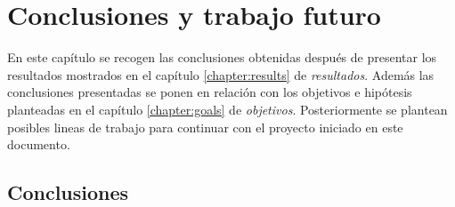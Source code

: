 \chapter{Conclusiones y trabajo futuro}

En este capítulo se recogen las conclusiones obtenidas después de presentar los resultados mostrados en el capítulo \ref{chapter:results} de \textit{resultados}. Además las conclusiones presentadas se ponen en relación con los objetivos e hipótesis planteadas en el capítulo \ref{chapter:goals} de \textit{objetivos}. Posteriormente se plantean posibles lineas de trabajo para continuar con el proyecto iniciado en este documento.

\section{Conclusiones}

